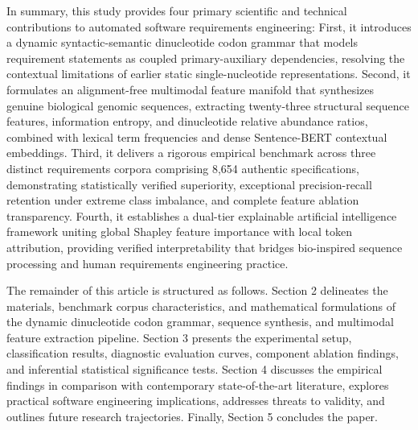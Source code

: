 In summary, this study provides four primary scientific and technical contributions to automated software requirements engineering:
First, it introduces a dynamic syntactic-semantic dinucleotide codon grammar that models requirement statements as coupled primary-auxiliary dependencies, resolving the contextual limitations of earlier static single-nucleotide representations.
Second, it formulates an alignment-free multimodal feature manifold that synthesizes genuine biological genomic sequences, extracting twenty-three structural sequence features, information entropy, and dinucleotide relative abundance ratios, combined with lexical term frequencies and dense Sentence-BERT contextual embeddings.
Third, it delivers a rigorous empirical benchmark across three distinct requirements corpora comprising 8,654 authentic specifications, demonstrating statistically verified superiority, exceptional precision-recall retention under extreme class imbalance, and complete feature ablation transparency.
Fourth, it establishes a dual-tier explainable artificial intelligence framework uniting global Shapley feature importance with local token attribution, providing verified interpretability that bridges bio-inspired sequence processing and human requirements engineering practice.

The remainder of this article is structured as follows. Section 2 delineates the materials, benchmark corpus characteristics, and mathematical formulations of the dynamic dinucleotide codon grammar, sequence synthesis, and multimodal feature extraction pipeline. Section 3 presents the experimental setup, classification results, diagnostic evaluation curves, component ablation findings, and inferential statistical significance tests. Section 4 discusses the empirical findings in comparison with contemporary state-of-the-art literature, explores practical software engineering implications, addresses threats to validity, and outlines future research trajectories. Finally, Section 5 concludes the paper.